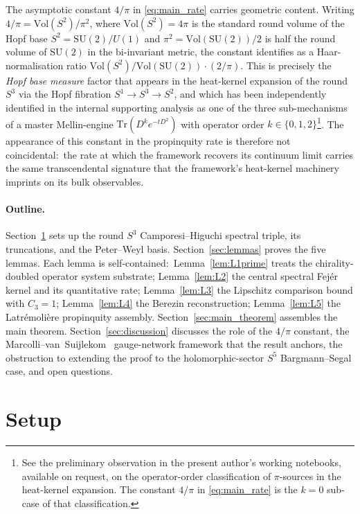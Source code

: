 \documentclass[11pt,a4paper]{article}
\theoremstyle{plain}
\theoremstyle{definition}
\newcommand{\sthree}{S^{3}}
\newcommand{\SU}{\mathrm{SU}}
\newcommand{\Vol}{\mathrm{Vol}}
\newcommand{\Tr}{\mathrm{Tr}}
\begin{document}
The asymptotic constant $4/\pi$ in \eqref{eq:main_rate} carries
geometric content. Writing
$4/\pi = \Vol(S^2) / \pi^2$, where $\Vol(S^2) = 4\pi$ is the standard
round volume of the Hopf base $S^2 = \SU(2)/U(1)$ and $\pi^2 =
\Vol(\SU(2))/2$ is half the round volume of $\SU(2)$ in the bi-invariant
metric, the constant identifies as a Haar-normalisation ratio
$\Vol(S^2)/\Vol(\SU(2)) \cdot (2/\pi)$. This is precisely the
\emph{Hopf base measure} factor that appears in the heat-kernel
expansion of the round $\sthree$ via the Hopf fibration $S^1 \to
\sthree \to S^2$, and which has been independently identified in the
internal supporting analysis as one of the three sub-mechanisms of a
master Mellin-engine $\Tr (D^k e^{-tD^2})$ with operator order
$k \in \{0, 1, 2\}$\footnote{See the preliminary observation in the
present author's working notebooks, available on request, on the
operator-order classification of $\pi$-sources in the heat-kernel
expansion. The constant $4/\pi$ in \eqref{eq:main_rate} is the $k=0$
sub-case of that classification.}. The appearance of this constant in
the propinquity rate is therefore not coincidental:\ the rate at which
the framework recovers its continuum limit carries the same
transcendental signature that the framework's heat-kernel machinery
imprints on its bulk observables.

\paragraph{Outline.}
Section~\ref{sec:setup} sets up the round $\sthree$
Camporesi--Higuchi spectral triple, its truncations, and the Peter--Weyl
basis. Section~\ref{sec:lemmas} proves the five lemmas. Each lemma is
self-contained:\ Lemma~\ref{lem:L1prime} treats the chirality-doubled
operator system substrate; Lemma~\ref{lem:L2} the central spectral
Fej\'er kernel and its quantitative rate; Lemma~\ref{lem:L3} the
Lipschitz comparison bound with $C_3 = 1$; Lemma~\ref{lem:L4} the
Berezin reconstruction; Lemma~\ref{lem:L5} the Latr\'emoli\`ere
propinquity assembly. Section~\ref{sec:main_theorem} assembles the
main theorem. Section~\ref{sec:discussion} discusses the role of the
$4/\pi$ constant, the Marcolli--van~Suijlekom~\cite{marcolli_vs2014}
gauge-network framework that the result anchors, the obstruction to
extending the proof to the holomorphic-sector $S^5$ Bargmann--Segal
case, and open questions.

\section{Setup}\label{sec:setup}
\end{document}
